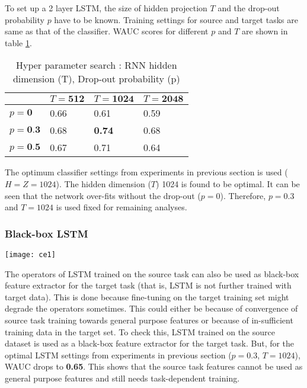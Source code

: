 \noindent To set up a 2 layer LSTM, the size of hidden projection $T$ and the drop-out probability $p$ have to be known. Training settings for source and target tasks are same as that of the classifier. WAUC scores for different  $p$ and $T$ are shown in table \ref{tabl:a4}.
\begin{table}[H]
\label{tabl:a4}
\centering
\begin{tabular}{| p{} | p{}| p{}| p{} |}
\hline
& $T = \textbf{512}$ & $T = \textbf{1024}$ & $T = \textbf{2048}$\\
\hline
$p = \textbf{0}$  & 0.66 & 0.61 & 0.59\\
\hline
$p = \textbf{0.3}$ & 0.68 & \textbf{0.74} & 0.68\\ 
\hline
$p = \textbf{0.5}$ & 0.67 & 0.71 & 0.64\\
\hline
\end{tabular}
\caption{Hyper parameter search : RNN hidden dimension (T), Drop-out probability (p)} 
\end{table}
\FloatBarrier

\noindent The optimum classifier settings from experiments in previous section is used ($H = Z = 1024$). The hidden dimension ($T$) 1024 is found to be optimal. It can be seen that the network over-fits without the drop-out ($p = 0$). Therefore, $p = 0.3$ and $T = 1024$ is used fixed for remaining analyses.

\subsubsection{Black-box LSTM}
\begin{minipage}{0.15\textwidth}
\texttt{[image: ce1]}
\end{minipage}
\begin{minipage}{0.80\textwidth}
The operators of LSTM trained on the source task can also be used as black-box feature extractor for the target task (that is, LSTM is not further trained with target data). This is done because fine-tuning on the target training set might degrade the operators sometimes. This could either be because of convergence of source task training towards general purpose features or because of in-sufficient training data in the target set. To check this, LSTM trained on the source dataset is used as a black-box feature extractor for the target task. But, for the optimal LSTM settings from experiments in previous section ($p = 0.3$, $T=1024$), WAUC drops to \textbf{0.65}. This shows that the source task features cannot be used as general purpose features and still needs task-dependent training. 
\end{minipage}


